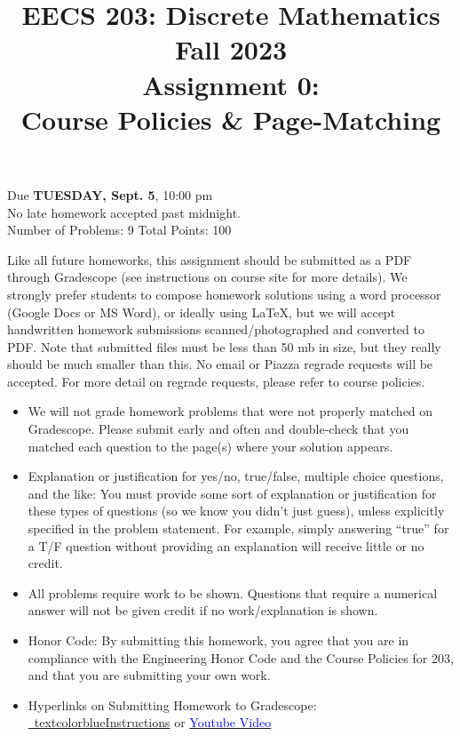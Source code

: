 \documentclass[12pt]{exam}
\begin{document}
\title{EECS 203: Discrete Mathematics\\
Fall 2023\\
Assignment 0: \\
Course Policies \& Page-Matching}
\date{}
\author{}
\maketitle
\vspace{-50pt}
\begin{center}
\huge Due \textbf{TUESDAY, Sept. 5}, 10:00 pm\\
\Large No late homework accepted past midnight.\\
\vspace{10pt}
\large Number of Problems: 9
\hspace{3cm}
Total Points: 100
\end{center}
\vspace{25pt}
Like all future homeworks, this assignment should be submitted as a PDF through
Gradescope (see instructions on course site for more details). We strongly prefer
students to compose homework solutions using a word processor (Google Docs or MS
Word), or ideally using \LaTeX, but we will accept handwritten homework submissions
scanned/photographed and converted to PDF. Note that submitted files must be less
than 50 mb in size, but they really should be much smaller than this. No email or
Piazza regrade requests will be accepted. For more detail on regrade requests,
please refer to course policies.
\begin{itemize}
\item We will not grade homework problems that were not properly matched on
Gradescope. Please submit early and often and double-check that you matched each
question to the page(s) where your solution appears.
\item Explanation or justification for yes/no, true/false, multiple choice
questions, and the like: You must provide some sort of explanation or justification
for these types of questions (so we know you didn’t just guess), unless explicitly
specified in the problem statement. For example, simply answering “true” for a T/F
question without providing an explanation will receive little or no credit.
\item All problems require work to be shown. Questions that require a numerical
answer will not be given credit if no work/explanation is shown.
\item Honor Code: By submitting this homework, you agree that you are in
compliance with the Engineering Honor Code and the Course Policies for 203, and
that you are submitting your own work.
\item Hyperlinks on Submitting Homework to Gradescope:
\href{https://www.gradescope.com/help#help-center-item-student-submitting}{\
textcolor{blue}{Instructions}} or
\href{https://youtu.be/KMPoby5g_nE}{\textcolor{blue}{Youtube Video}}
\end{itemize}
\newpage
\end{document}

